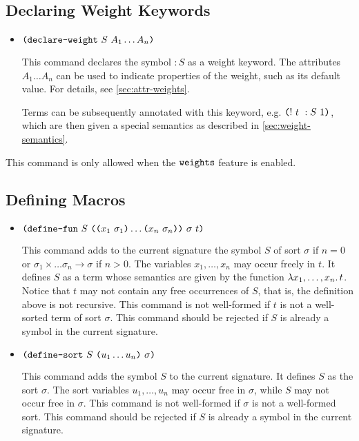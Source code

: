 \documentclass[english,a4paper,10pt]{article}
\begin{document}
\subsection{Declaring Weight Keywords}
\label{ssec:declaring-weights}

\begin{itemize}
\item $\texttt{(}\texttt{declare-weight}\mbox{ }S\mbox{ }A_1 \ldots A_n\texttt{)}$

This command declares the symbol $:S$ as a weight keyword.
The attributes $A_1 \ldots A_n$ can be used to indicate properties of the weight,
such as its default value.
For details, see \cref{sec:attr-weights}.

Terms can be subsequently annotated
with this keyword, e.g. $\texttt{(}!\mbox{ }t\mbox{ }:S\mbox{ }1\texttt{)}$,
which are then given a special semantics as described in \cref{sec:weight-semantics}.

\end{itemize}
This command is only allowed when the $\texttt{weights}$ feature is enabled.

\subsection{Defining Macros}

\begin{itemize}
\item $\texttt{(}\texttt{define-fun}\mbox{ }S\mbox{ }\texttt{(}\texttt{(}x_1\mbox{ }\sigma_1\texttt{)} \ldots \texttt{(}x_n\mbox{ }\sigma_n\texttt{)}\texttt{)}\mbox{ }\sigma\mbox{ }t\texttt{)}$

This command adds to the current signature
the symbol $S$ of sort $\sigma$
if $n=0$ or $\sigma_1 \times \ldots \sigma_n \rightarrow \sigma$ if $n>0$.
The variables $x_1, \ldots, x_n$ may occur freely in $t$.
It defines $S$ as a term whose semantics are given by the function
$\lambda x_1, \ldots, x_n \ldotp t$.
Notice that $t$ may not contain any free occurrences of $S$,
that is, the definition above is not recursive.
This command is not well-formed if $t$ is not a well-sorted
term of sort $\sigma$.
This command should be rejected if $S$ is already
a symbol in the current signature.

\item $\texttt{(}\texttt{define-sort}\mbox{ }S\mbox{ }\texttt{(}u_1 \ldots u_n\texttt{)}\mbox{ }\sigma\texttt{)}$

This command adds the symbol $S$ to the current signature.
It defines $S$ as the sort $\sigma$.
The sort variables $u_1, \ldots, u_n$
may occur free in $\sigma$,
while $S$ may not occur free in $\sigma$.
This command is not well-formed if $\sigma$
is not a well-formed sort.
This command should be rejected if $S$ is already
a symbol in the current signature.

\end{itemize}
\end{document}
